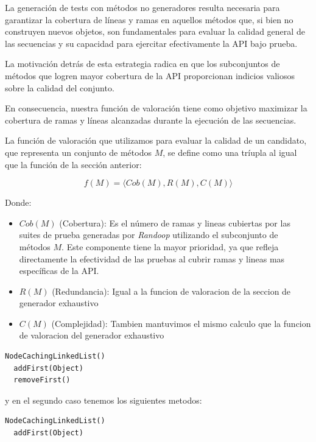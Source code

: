 La generación de tests con métodos no generadores resulta necesaria para garantizar la cobertura de líneas y ramas en aquellos métodos 
que, si bien no construyen nuevos objetos, son fundamentales para evaluar la calidad general de las secuencias y su capacidad para ejercitar efectivamente la API bajo prueba. 

La motivación detrás de esta estrategia radica en que los subconjuntos de métodos que logren mayor cobertura de la API 
proporcionan indicios valiosos sobre la calidad del conjunto. 

En consecuencia, nuestra función de valoración tiene como objetivo maximizar la cobertura de ramas y líneas alcanzadas durante la ejecución de las secuencias.
    
La función de valoración que utilizamos para evaluar la calidad de un candidato, 
que representa un conjunto de métodos $M$, se define como una tríupla al igual que la función de la sección anterior:

\[
f(M) = \langle Cob(M), R(M), C(M) \rangle
\]

Donde:

\begin{itemize}
    \item $Cob(M)$ (Cobertura): Es el número de ramas y lineas cubiertas por las suites de prueba generadas por \emph{Randoop} utilizando el subconjunto de métodos $M$. 
    Este componente tiene la mayor prioridad, ya que refleja directamente la efectividad de las pruebas al cubrir ramas y lineas mas específicas de la API.
    \item $R(M)$ (Redundancia): Igual a la funcion de valoracion de la seccion de generador exhaustivo
    \item $C(M)$ (Complejidad): Tambien mantuvimos el mismo calculo que la funcion de valoracion del generador exhaustivo
\end{itemize}

\vspace{5pt} 

\begin{lstlisting}[numbers=none, caption=Conjunto de métodos \( M_1 \)]
  NodeCachingLinkedList()
  addFirst(Object)
  removeFirst()
\end{lstlisting} 

y en el segundo caso tenemos los siguientes metodos:

\begin{lstlisting}[numbers=none, caption=Conjunto de métodos \( M_2 \)]
  NodeCachingLinkedList()
  addFirst(Object)
\end{lstlisting}


